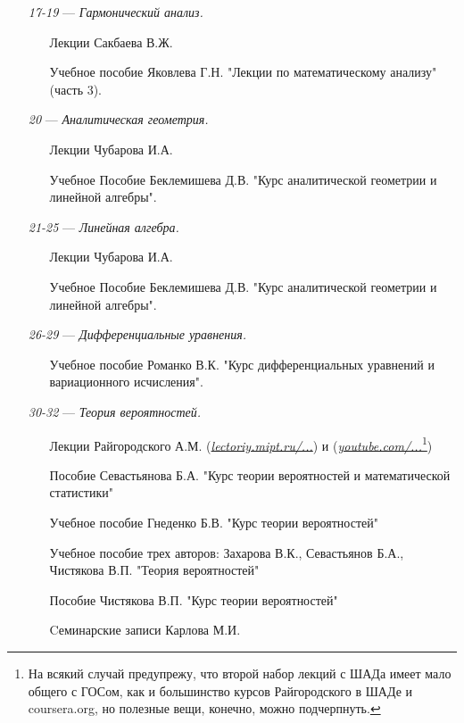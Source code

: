 \begin{itemize}
\item[\textit{17-19}] 
\; --- \: \textit{Гармонический анализ.}
\begin{itemize}
\item[\textbullet]
Лекции Сакбаева В.Ж.
\item[\textbullet]
Учебное пособие Яковлева Г.Н. "Лекции по математическому анализу"  (часть 3).
\end{itemize}

\item[\textit{20}] 
\; --- \: \textit{Аналитическая геометрия.}
\begin{itemize}
\item[\textbullet]
Лекции Чубарова И.А. 
\item[\textbullet]
Учебное Пособие Беклемишева Д.В. "Курс аналитической геометрии и линейной алгебры".
\end{itemize}

\item[\textit{21-25}] 
\; --- \: \textit{Линейная алгебра.}
\begin{itemize}
\item[\textbullet]
Лекции Чубарова И.А. 
\item[\textbullet]
Учебное Пособие Беклемишева Д.В. "Курс аналитической геометрии и линейной алгебры".
\end{itemize}

\item[\textit{26-29}] 
\; --- \: \textit{Дифференциальные уравнения.}
\begin{itemize}
\item[\textbullet] 
Учебное пособие Романко В.К. "Курс дифференциальных уравнений и вариационного исчисления".
\end{itemize}

\item[\textit{30-32}]
\; --- \: \textit{Теория вероятностей.}
\begin{itemize}
\item[\textbullet]
Лекции Райгородского А.М. (\href{http://lectoriy.mipt.ru/course/Maths-ProbabilityTheoryBasics-L15}{\textit{lectoriy.mipt.ru/...}}) и (\href{https://www.youtube.com/playlist?list=PLJOzdkh8T5kouOIbZDCqzB72hBn9T7gsJ}{\textit{youtube.com/...}\footnote{На всякий случай предупрежу, что второй набор лекций с ШАДа имеет мало общего с ГОСом, как и большинство курсов Райгородского в ШАДе и coursera.org, но полезные вещи, конечно, можно подчерпнуть.}})
\item[\textbullet]
Пособие Севастьянова Б.А. "Курс теории вероятностей и математической статистики"
\item[\textbullet]
Учебное пособие Гнеденко Б.В. "Курс теории вероятностей"
\item [\textbullet]
Учебное пособие трех авторов: Захарова В.К., Севастьянов Б.А., Чистякова В.П. "Теория вероятностей"
\item[\textbullet]
Пособие Чистякова В.П. "Курс теории вероятностей"
\item[\textbullet]
Cеминарские записи Карлова М.И.
\end{itemize}


\end{itemize}
